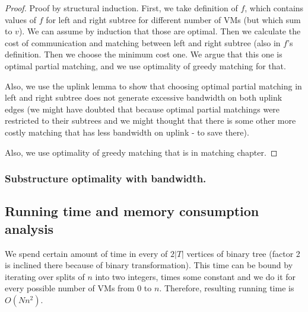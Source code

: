 \begin{proof}
Proof by structural induction. First, we take definition of $f$, which contains values of $f$ for left and right subtree for different number of VMs (but which sum to $v$). We can assume by induction that those are optimal. Then we calculate the cost of communication and matching between left and right subtree (also in $f$'s definition. Then we choose the minimum cost one. We argue that this one is optimal partial matching, and we use optimality of greedy matching for that.

Also, we use the uplink lemma to show that choosing optimal partial matching in left and right subtree does not generate excessive bandwidth on both uplink edges (we might have doubted that because optimal partial matchings were restricted to their subtrees and we might thought that there is some other more costly matching that has less bandwidth on uplink - to save there).

Also, we use optimality of greedy matching that is in matching chapter.
\end{proof}

\subsubsection{Substructure optimality with bandwidth.}
\subsection{Running time and memory consumption analysis}

We spend
certain amount of time in every of $2|T|$ vertices of binary
tree (factor 2 is inclined there because of binary transformation). This time can be
bound by iterating over splits of $n$ into two integers, times some
constant and we do it for every possible number of VMs from $0$ to $n$. Therefore, resulting running time is $O(Nn^2)$.

